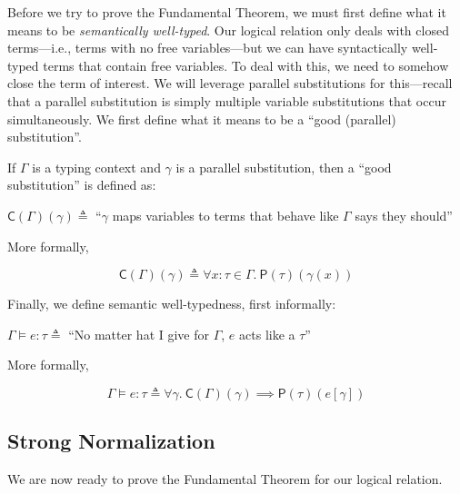 \documentclass{lecturenotes}
\newcommand{\lr}[2]{\ensuremath{\mathsf{P}(#1)(#2)}}
\newcommand{\gdsubst}[2]{\ensuremath{\mathsf{C}(#1)(#2)}}
\begin{document}
Before we try to prove the Fundamental Theorem, we must first define what it means to be \emph{semantically well-typed}.
Our logical relation only deals with closed terms---i.e., terms with no free variables---but we can have syntactically well-typed terms that contain free variables.
To deal with this, we need to somehow close the term of interest.
We will leverage parallel substitutions for this---recall that a parallel substitution is simply multiple variable substitutions that occur simultaneously.
We first define what it means to be a ``good (parallel) substitution''.

If $\Gamma$ is a typing context and $\gamma$ is a parallel substitution, then a ``good substitution'' is defined as: \\

\begin{center}
  $\gdsubst{\Gamma}{\gamma} \triangleq$ ``$\gamma$ maps variables to terms that behave like $\Gamma$ says they should''
\end{center}

More formally,

$$\gdsubst{\Gamma}{\gamma} \triangleq \forall x : \tau \in \Gamma.~\lr{\tau}{\gamma(x)}$$

Finally, we define semantic well-typedness, first informally: \\

\begin{center}
  $\Gamma \vDash e : \tau \triangleq$ ``No matter hat I give for $\Gamma$, $e$ acts like a $\tau$''
\end{center}

More formally,

$$\Gamma \vDash e : \tau \triangleq \forall \gamma.~\gdsubst{\Gamma}{\gamma} \implies \lr{\tau}{e[\gamma]}$$

\subsection{Strong Normalization}

We are now ready to prove the Fundamental Theorem for our logical relation.
\end{document}
